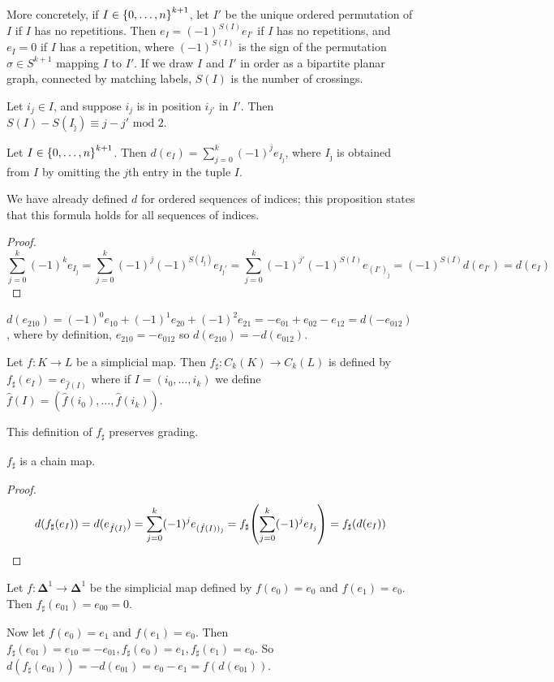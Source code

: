 More concretely, if \( I \in \qty{0, \dots, n}^{k+1} \), let \( I' \) be the unique ordered permutation of \( I \) if \( I \) has no repetitions.
Then \( e_I = (-1)^{S(I)} e_{I'} \) if \( I \) has no repetitions, and \( e_I = 0 \) if \( I \) has a repetition, where \( (-1)^{S(I)} \) is the sign of the permutation \( \sigma \in S^{k+1} \) mapping \( I \) to \( I' \).
If we draw \( I \) and \( I' \) in order as a bipartite planar graph, connected by matching labels, \( S(I) \) is the number of crossings.
\begin{lemma}
	Let \( i_j \in I \), and suppose \( i_j \) is in position \( i_{j'} \) in \( I' \).
	Then \( S(I) - S(I_{\hat\jmath}) \equiv j - j' \text{ mod } 2 \).
\end{lemma}
\begin{proposition}
	Let \( I \in \qty{0, \dots, n}^{k+1} \).
	Then \( d(e_I) = \sum_{j=0}^k (-1)^j e_{I_{\hat\jmath}} \), where \( I_{\hat\jmath} \) is obtained from \( I \) by omitting the \( j \)th entry in the tuple \( I \).
\end{proposition}
We have already defined \( d \) for ordered sequences of indices; this proposition states that this formula holds for all sequences of indices.
\begin{proof}
	\[ \sum_{j=0}^k (-1)^k e_{I_{\hat\jmath}} = \sum_{j=0}^k (-1)^j (-1)^{S(I_{\hat\jmath})} e_{I_{\hat\jmath}'} = \sum_{j=0}^k (-1)^{j'} (-1)^{S(I)} e_{(I')_{\hat\jmath}} = (-1)^{S(I)} d(e_{I'}) = d(e_I) \]
\end{proof}
\begin{example}
	\( d(e_{210}) = (-1)^0 e_{10} + (-1)^1 e_{20} + (-1)^2 e_{21} = -e_{01} + e_{02} - e_{12} = d(-e_{012}) \), where by definition, \( e_{210} = -e_{012} \) so \( d(e_{210}) = -d(e_{012}) \).
\end{example}
\begin{definition}
	Let \( f \colon K \to L \) be a simplicial map.
	Then \( f_\sharp \colon C_k(K) \to C_k(L) \) is defined by \( f_\sharp(e_I) = e_{\hat f(I)} \) where if \( I = (i_0, \dots, i_k) \) we define \( \hat f(I) = (\hat f(i_0), \dots, \hat f(i_k)) \).
\end{definition}
This definition of \( f_\sharp \) preserves grading.
\begin{proposition}
	\( f_\sharp \) is a chain map.
\end{proposition}
\begin{proof}
	\[ d(f_\sharp(e_I)) = d(e_{\hat f(I)}) = \sum_{j=0}^k (-1)^j e_{(\hat f(I))_{\hat \jmath}} = f_\sharp\qty(\sum_{j=0}^k (-1)^j e_{I_{\hat\jmath}}) = f_\sharp(d(e_I)) \]
\end{proof}
\begin{example}
	Let \( f \colon \bm\Delta^1 \to \bm\Delta^1 \) be the simplicial map defined by \( f(e_0) = e_0 \) and \( f(e_1) = e_0 \).
	Then \( f_\sharp(e_{01}) = e_{00} = 0 \).

	Now let \( f(e_0) = e_1 \) and \( f(e_1) = e_0 \).
	Then \( f_\sharp(e_{01}) = e_{10} = -e_{01}, f_\sharp(e_0) = e_1, f_\sharp(e_1) = e_0 \).
	So \( d(f_\sharp(e_{01})) = -d(e_{01}) = e_0 - e_1 = f(d(e_{01})) \).
\end{example}

